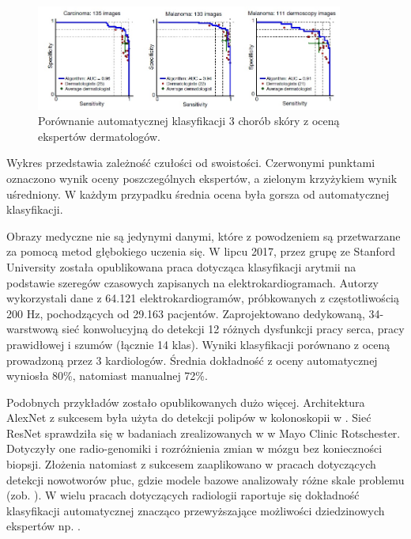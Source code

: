  \begin{figure}[h!]
 	\centering
 	\includegraphics[width=0.9\textwidth]{figures/CAD-dermatolodzy.jpg}
 	\caption{Porównanie automatycznej klasyfikacji 3 chorób skóry z oceną ekspertów dermatologów.}
 	\label{CAD_derma}
 \end{figure}

Wykres przedstawia zależność czułości od swoistości. Czerwonymi punktami oznaczono wynik oceny poszczególnych ekspertów, a zielonym krzyżykiem wynik uśredniony. W każdym przypadku średnia ocena była gorsza od automatycznej klasyfikacji.

Obrazy medyczne nie są jedynymi danymi, które z powodzeniem są przetwarzane za pomocą metod głębokiego uczenia się. W lipcu 2017, przez grupę ze Stanford University została opublikowana praca \cite{2017arXiv170701836R} dotycząca klasyfikacji arytmii na podstawie szeregów czasowych zapisanych na elektrokardiogramach. Autorzy wykorzystali dane z 64.121 elektrokardiogramów, próbkowanych z częstotliwością 200 Hz, pochodzących od 29.163 pacjentów. Zaprojektowano dedykowaną, 34-warstwową sieć konwolucyjną do detekcji 12 różnych dysfunkcji pracy serca, pracy prawidłowej i szumów (łącznie 14 klas). Wyniki klasyfikacji porównano z oceną prowadzoną przez 3 kardiologów. Średnia dokładność z oceny automatycznej wyniosła 80\%, natomiast manualnej 72\%.

Podobnych przykładów zostało opublikowanych dużo więcej. Architektura AlexNet z sukcesem była użyta do detekcji polipów w kolonoskopii w \cite{Tajbakhsh2016}. Sieć ResNet sprawdziła się w badaniach zrealizowanych w \cite{Erickson2018} w Mayo Clinic Rotschester. Dotyczyły one radio-genomiki i rozróżnienia zmian w mózgu bez konieczności biopsji. Złożenia natomiast z sukcesem zaaplikowano w pracach dotyczących detekcji nowotworów płuc, gdzie modele bazowe analizowały różne skale problemu (zob. \cite{LungChalenge}). W wielu pracach dotyczących radiologii raportuje się dokładność klasyfikacji automatycznej znacząco przewyższające możliwości dziedzinowych ekspertów np. \cite{Christiansen2018, Sarraf2016, Glasser2016, 2016arXiv160605718W}.

